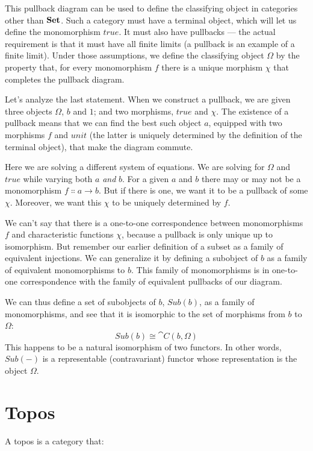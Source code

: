 This pullback diagram can be used to define the classifying object in
categories other than $\mathbf{Set}$. Such a category must have a terminal
object, which will let us define the monomorphism $\mathit{true}$. It must
also have pullbacks --- the actual requirement is that it must have all
finite limits (a pullback is an example of a finite limit). Under those
assumptions, we define the classifying object $\Omega$ by the property
that, for every monomorphism $f$ there is a unique morphism
$\chi$ that completes the pullback diagram.

Let's analyze the last statement. When we construct a pullback, we are
given three objects $\Omega$, $b$ and $1$; and two
morphisms, $\mathit{true}$ and $\chi$. The existence of a pullback
means that we can find the best such object $a$, equipped with
two morphisms $f$ and $\mathit{unit}$ (the latter is uniquely
determined by the definition of the terminal object), that make the
diagram commute.

Here we are solving a different system of equations. We are solving for
$\Omega$ and $\mathit{true}$ while varying both $a$ \emph{and}
$b$. For a given $a$ and $b$ there may or may not
be a monomorphism $f \Colon a \to b$. But if there is one, we
want it to be a pullback of some $\chi$. Moreover, we want this
$\chi$ to be uniquely determined by $f$.

We can't say that there is a one-to-one correspondence between
monomorphisms $f$ and characteristic functions $\chi$,
because a pullback is only unique up to isomorphism. But remember our
earlier definition of a subset as a family of equivalent injections. We
can generalize it by defining a subobject of $b$ as a family of
equivalent monomorphisms to $b$. This family of monomorphisms is
in one-to-one correspondence with the family of equivalent pullbacks of
our diagram.

We can thus define a set of subobjects of $b$, $\mathit{Sub}(b)$,
as a family of monomorphisms, and see that it is isomorphic to the set
of morphisms from $b$ to $\Omega$:
\[\mathit{Sub}(b) \cong \cat{C}(b, \Omega)\]
This happens to be a natural isomorphism of two functors. In other
words, $\mathit{Sub}(-)$ is a representable (contravariant) functor whose
representation is the object $\Omega$.

\section{Topos}

A topos is a category that:

